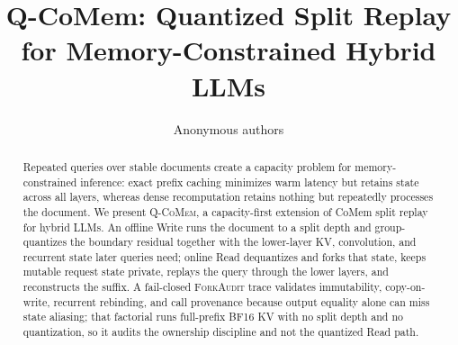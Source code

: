 \documentclass{article}
\title{Q-CoMem: Quantized Split Replay for Memory-Constrained Hybrid LLMs}
\author{Anonymous authors}
\newcommand{\qcomem}{\textsc{Q-CoMem}}
\newcommand{\method}{\textsc{ForkAudit}}
\begin{document}
\raggedbottom
\maketitle

\begin{abstract}
Repeated queries over stable documents create a capacity problem for
memory-constrained inference: exact prefix caching minimizes warm latency but
retains state across all layers, whereas dense recomputation retains nothing
but repeatedly processes the document.  We present \qcomem{}, a capacity-first
extension of CoMem split replay for hybrid LLMs.  An offline Write runs the
document to a split depth and group-quantizes the boundary residual together
with the lower-layer KV, convolution, and recurrent state later queries need;
online Read dequantizes and forks that state, keeps mutable request state
private, replays the query through the lower layers, and reconstructs the
suffix.  A fail-closed \method{} trace validates immutability,
copy-on-write, recurrent rebinding, and call provenance because output equality
alone can miss state aliasing; that factorial runs full-prefix BF16 KV with no
split depth and no quantization, so it audits the ownership discipline and not
the quantized Read path.


\end{abstract}
\end{document}
